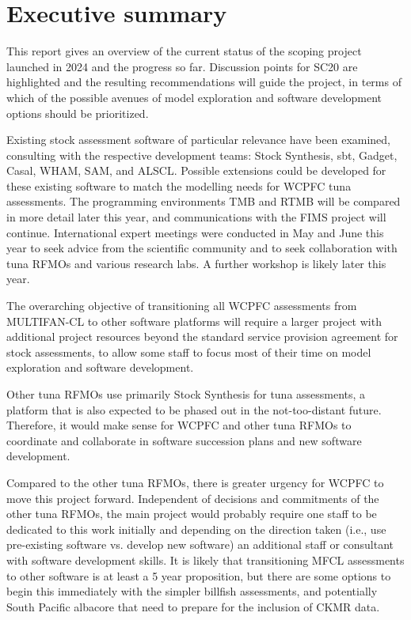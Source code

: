 \documentclass{SCreport}
\begin{document}
\wcpfctitlepage

\tableofcontents
\newpage

\section{Executive summary}

This report gives an overview of the current status of the scoping project
launched in 2024 and the progress so far. Discussion points for SC20 are
highlighted and the resulting recommendations will guide the project, in terms
of which of the possible avenues of model exploration and software development
options should be prioritized.

Existing stock assessment software of particular relevance have been examined,
consulting with the respective development teams: Stock Synthesis, sbt, Gadget,
Casal, WHAM, SAM, and ALSCL. Possible extensions could be developed for these
existing software to match the modelling needs for WCPFC tuna assessments. The
programming environments TMB and RTMB will be compared in more detail later this
year, and communications with the FIMS project will continue. International
expert meetings were conducted in May and June this year to seek advice from the
scientific community and to seek collaboration with tuna RFMOs and various
research labs. A further workshop is likely later this year.

The overarching objective of transitioning all WCPFC assessments from
MULTIFAN-CL to other software platforms will require a larger project with
additional project resources beyond the standard service provision agreement for
stock assessments, to allow some staff to focus most of their time on model
exploration and software development.

Other tuna RFMOs use primarily Stock Synthesis for tuna assessments, a platform
that is also expected to be phased out in the not-too-distant future. Therefore,
it would make sense for WCPFC and other tuna RFMOs to coordinate and collaborate
in software succession plans and new software development.

Compared to the other tuna RFMOs, there is greater urgency for WCPFC to move
this project forward. Independent of decisions and commitments of the other tuna
RFMOs, the main project would probably require one staff to be dedicated to this
work initially and depending on the direction taken (i.e., use pre-existing
software vs. develop new software) an additional staff or consultant with
software development skills. It is likely that transitioning MFCL assessments to
other software is at least a 5 year proposition, but there are some options to
begin this immediately with the simpler billfish assessments, and potentially
South Pacific albacore that need to prepare for the inclusion of CKMR data.
\end{document}
